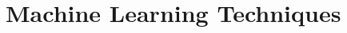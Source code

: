 \documentclass[a4paper,oneside]{scrbook}
\begin{document}
\part{Machine Learning Techniques}



%

\end{document}
